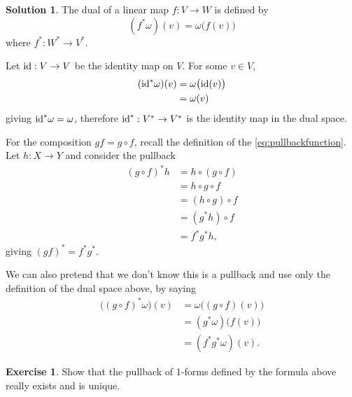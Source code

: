 \documentclass[11pt, a4paper]{report}
\theoremstyle{definition}
\newtheorem{exercise}{Exercise}[part]
\newtheorem{solution}{Solution}[part]
\newenvironment{ex}{\begin{exercise}}{\end{exercise}\pagebreak[1]}
\newenvironment{sol}{\begin{solution}}{\end{solution}\pagebreak[3]}
\newcommand*{\op}[1]{\ensuremath\mathop{}\mathopen{}#1}
\newcommand*{\id}{\op{\mathrm{id}}}
\begin{document}
\begin{sol}

The dual of a linear map $f: V \to W$ is defined by
\[
    (f^*\omega)(v) = \omega \bigl( f(v) \bigr)
\]
where $f^*: W^* \to V^*$.

Let $\id: V \to V$ be the identity map on $V$. For some $v \in V$,
\begin{align*}
    (\id^*\omega)(v) &= \omega \bigl( \id(v) \bigr) \\
                           &= \omega(v)
\end{align*}
giving $\id^*\omega = \omega$, therefore $\id^*: V^* \to V^*$ is the identity map in the dual space.

For the composition $gf = g \circ f$, recall the definition of the \ref{eq:pullbackfunction}. %
Let $h: X \to Y$ and consider the pullback
\begin{align*}
    {(g \circ f)}^* h &= h \circ (g \circ f) \\
                      &= h \circ g \circ f \\
                      &= (h \circ g) \circ f \\
                      &= (g^* h) \circ f \\
                      &= f^* g^* h,
\end{align*}
giving ${(gf)}^* = f^* g^*$.

We can also pretend that we don't know this is a pullback and use only the definition of the dual space above, by saying
\begin{align*}
    \bigl( {(g \circ f)}^*\omega \bigr)(v)
        &= \omega \bigl( (g \circ f)(v) \bigr) \\
        &= (g^* \omega) \bigl( f(v) \bigr) \\
        &= (f^* g^* \omega)(v).
\end{align*}

\end{sol}

\begin{ex}

Show that the pullback of 1-forms defined by the formula above really exists and is unique.

\end{ex}
\end{document}
